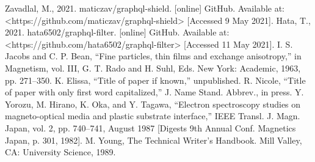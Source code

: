 \documentclass[conference]{IEEEtran}
\begin{document}
\begin{thebibliography}{00}
 Zavadlal, M., 2021. maticzav/graphql-shield. [online] GitHub. Available at: <https://github.com/maticzav/graphql-shield> [Accessed 9 May 2021].
 Hata, T., 2021. hata6502/graphql-filter. [online] GitHub. Available at: <https://github.com/hata6502/graphql-filter> [Accessed 11 May 2021].
 I. S. Jacobs and C. P. Bean, ``Fine particles, thin films and exchange anisotropy,'' in Magnetism, vol. III, G. T. Rado and H. Suhl, Eds. New York: Academic, 1963, pp. 271--350.
 K. Elissa, ``Title of paper if known,'' unpublished.
 R. Nicole, ``Title of paper with only first word capitalized,'' J. Name Stand. Abbrev., in press.
 Y. Yorozu, M. Hirano, K. Oka, and Y. Tagawa, ``Electron spectroscopy studies on magneto-optical media and plastic substrate interface,'' IEEE Transl. J. Magn. Japan, vol. 2, pp. 740--741, August 1987 [Digests 9th Annual Conf. Magnetics Japan, p. 301, 1982].
 M. Young, The Technical Writer's Handbook. Mill Valley, CA: University Science, 1989.
\end{thebibliography}
\end{document}
